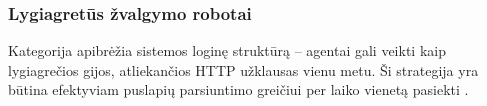 \subsubsection{Lygiagretūs žvalgymo robotai}

Kategorija apibrėžia sistemos loginę struktūrą -- agentai gali veikti kaip lygiagrečios gijos, atliekančios HTTP užklausas vienu metu. Ši strategija yra būtina efektyviam puslapių parsiuntimo greičiui per laiko vienetą pasiekti \cite{CategoriesOfWebCrawlersAndOverview}.